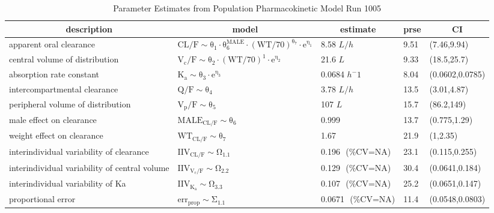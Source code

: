 \begin{table}[ht]
 \caption[Model 1005 Parameters]{Parameter Estimates from Population Pharmacokinetic Model Run 1005\label{p1005}} 
 \begin{center}
 \begin{tabular}{lllll}\hline\hline
\multicolumn{1}{c}{description}&\multicolumn{1}{c}{model}&\multicolumn{1}{c}{estimate}&\multicolumn{1}{c}{prse}&\multicolumn{1}{c}{CI}\tabularnewline
\hline
apparent oral clearance&$\mathrm{CL/F  \sim \theta_{1}\cdot  \theta_{6}^{MALE}\cdot (WT/70)^{\theta_{7}}\cdot e^{\eta_{1}}}$&8.58 $ L/h $&9.51&(7.46,9.94)\tabularnewline
central volume of distribution&$\mathrm{V_{c}/F  \sim \theta_{2}\cdot (WT/70)^{1}\cdot e^{\eta_{2}}}$&21.6 $ L $&9.33&(18.5,25.7)\tabularnewline
absorption rate constant&$\mathrm{K_{a} \sim \theta_{3}\cdot e^{\eta_{3}}}$&0.0684 $ h^-1  $&8.04&(0.0602,0.0785)\tabularnewline
intercompartmental clearance&$\mathrm{Q/F  \sim \theta_{4}}$&3.78 $ L/h $&13.5&(3.01,4.87)\tabularnewline
peripheral volume of distribution&$\mathrm{V_{p}/F  \sim \theta_{5}}$&107 $ L $&15.7&(86.2,149)\tabularnewline
male effect on clearance&$\mathrm{MALE_{CL/F}\sim \theta_{6}}$&0.999 $  $&13.7&(0.775,1.29)\tabularnewline
weight effect on clearance&$\mathrm{WT_{CL/F}\sim \theta_{7}}$&1.67 $  $&21.9&(1,2.35)\tabularnewline
interindividual variability of clearance&$\mathrm{IIV_{CL/F}\sim \Omega_{1.1}}$&0.196 $  $ (\%CV=NA)&23.1&(0.115,0.255)\tabularnewline
interindividual variability of central volume&$\mathrm{IIV_{V_{c}/F}\sim \Omega_{2.2}}$&0.129 $  $ (\%CV=NA)&30.4&(0.0641,0.184)\tabularnewline
interindividual variability of Ka&$\mathrm{IIV_{K_{a}}\sim \Omega_{3.3}}$&0.107 $  $ (\%CV=NA)&25.2&(0.0651,0.147)\tabularnewline
proportional error&$\mathrm{err_{prop}\sim \Sigma_{1.1}}$&0.0671 $  $ (\%CV=NA)&11.4&(0.0548,0.0803)\tabularnewline
\hline
\end{tabular}

\end{center}

\end{table}
